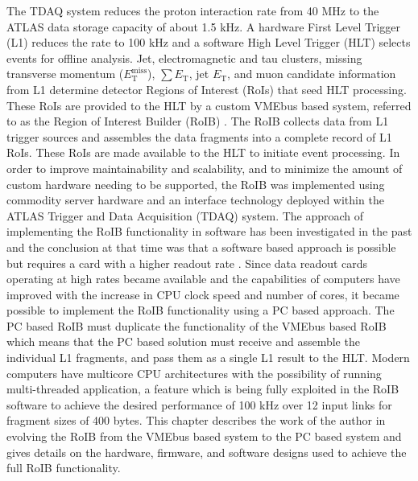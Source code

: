 The TDAQ system reduces the 
proton interaction rate from 40 MHz to the ATLAS data storage capacity of about 1.5 kHz. 
A hardware First Level Trigger (L1) reduces the rate to 100 kHz and a software High Level Trigger (HLT) selects events for offline analysis. 
Jet, electromagnetic and tau clusters, missing transverse momentum ($E_{\mathrm{T}}^{\mathrm{miss}}$), $\sum E_{\mathrm{T}}$, 
jet $E_{\mathrm{T}}$, and muon candidate information from L1 determine detector Regions of Interest (RoIs) that seed HLT processing. These RoIs are provided to the HLT by a custom VMEbus based system, referred to as the Region of Interest Builder (RoIB) \cite{vme_roib}.
The RoIB collects data from L1 
trigger sources and assembles the data fragments into a complete record of L1 RoIs. These RoIs are made available to the HLT to initiate event processing. In order to improve maintainability and scalability, and to minimize the amount of custom hardware needing to be supported, 
the RoIB was implemented using commodity server hardware and an interface technology deployed 
within the ATLAS Trigger and Data Acquisition (TDAQ) system. The approach of implementing the RoIB functionality in software has been investigated in the past 
and the conclusion at that time was that a software based approach is possible but requires a card with a higher readout rate \cite{swroib_past}. 
Since data readout cards operating at high rates became available and the capabilities of computers have improved with the increase 
in CPU clock speed and number of cores, it became possible to implement the RoIB functionality using a PC based approach. 
The PC based RoIB must duplicate the functionality of the VMEbus based RoIB which means that the PC based solution must receive and assemble the
individual L1 fragments, and pass them as a single L1 result to the HLT. Modern computers have multicore CPU architectures 
with the possibility of running multi-threaded application, a feature which is being fully exploited in the RoIB software to achieve 
the desired performance of 100 kHz over 12 input links for fragment sizes of 400 bytes.  
This chapter describes the work of the author in evolving the RoIB from the VMEbus based system to the PC based system and gives details on the hardware, 
firmware, and software designs used to achieve the full RoIB functionality. 



